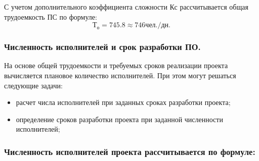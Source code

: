 




С учетом дополнительного коэффициента сложности Кс рассчитывается общая трудоемкость ПС по формуле:
\begin{equation}
  \label{eq:econ:effort_common_calc}
  \text{Т}_\text{о} = \num{745,8} \approx \num{746}{\text{чел.}/\text{дн.}}
\end{equation}


\subsubsection{Численность исполнителей и срок разработки ПО. }

На основе общей трудоемкости и требуемых сроков реализации проекта вычисляется плановое количество исполнителей. При этом могут решаться следующие задачи:

\begin{itemize}
  \item расчет числа исполнителей при заданных сроках разработки проекта;
  \item определение сроков разработки проекта при заданной численности исполнителей;
\end{itemize}

\subsubsection{Численность исполнителей проекта рассчитывается по формуле: }


